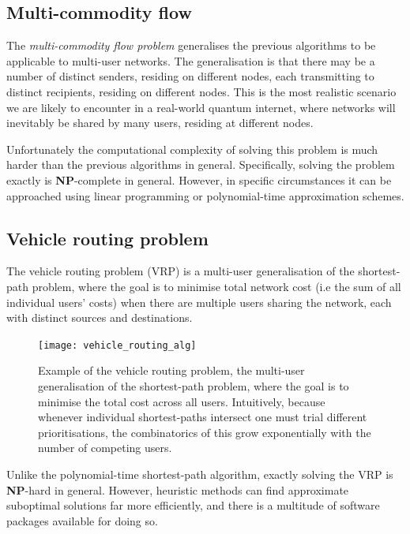 %
%

\subsection{Multi-commodity flow} \label{sec:multi_comm_flow} 

The \textit{multi-commodity flow problem} \cite{???} generalises the previous algorithms to be applicable to multi-user networks. The generalisation is that there may be a number of distinct senders, residing on different nodes, each transmitting to distinct recipients, residing on different nodes. This is the most realistic scenario we are likely to encounter in a real-world quantum internet, where networks will inevitably be shared by many users, residing at different nodes.

Unfortunately the computational complexity of solving this problem is much harder than the previous algorithms in general. Specifically, solving the problem exactly is \textbf{NP}-complete in general. However, in specific circumstances it can be approached using linear programming or polynomial-time approximation schemes.

%
%

\subsection{Vehicle routing problem} \label{sec:VRP} 

The vehicle routing problem (VRP) is a multi-user generalisation of the shortest-path problem, where the goal is to minimise total network cost (i.e the sum of all individual users' costs) when there are multiple users sharing the network, each with distinct sources and destinations.

\begin{figure}[!hbtp]
\texttt{[image: vehicle\_routing\_alg]}
	\caption{Example of the vehicle routing problem, the multi-user generalisation of the shortest-path problem, where the goal is to minimise the total cost across all users. Intuitively, because whenever individual shortest-paths intersect one must trial different prioritisations, the combinatorics of this grow exponentially with the number of competing users.}\label{fig:VRS}
\end{figure}

Unlike the polynomial-time shortest-path algorithm, exactly solving the VRP is \textbf{NP}-hard in general. However, heuristic methods can find approximate suboptimal solutions far more efficiently, and there is a multitude of software packages available for doing so.

